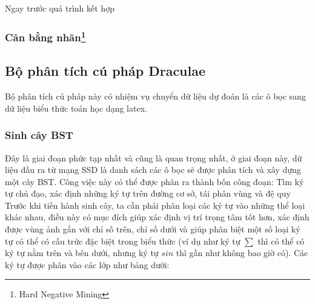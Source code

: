 \documentclass[a4paper,12pt]{article}
\begin{document}
	Ngay trước quá trình kết hợp
	
	\subsubsection*{Cân bằng nhãn\footnote{Hard Negative Mining}}	
	
	\subsection{Bộ phân tích cú pháp Draculae}
	
	Bộ phân tích cú pháp này có nhiệm vụ chuyển dữ liệu dự đoán là các ô bọc sang dữ liệu biểu thức toán học dạng latex.\\
	
	\subsubsection{Sinh cây BST}
	
	Đây là giai đoạn phức tạp nhất và cũng là quan trọng nhất, ở giai đoạn này, dữ liệu đầu ra từ mạng SSD là danh sách các ô bọc sẽ được phân tích và xây dựng một cây BST. Công việc này có thể được phân ra thành bốn công đoạn: Tìm ký tự chủ đạo, xác định những ký tự trên đường cơ sở, tái phân vùng và đệ quy\\
	
	Trước khi tiến hành sinh cây, ta cần phải phân loại các ký tự vào những thể loại khác nhau, điều này có mục đích giúp xác định vị trí trọng tâm tốt hơn, xác định được vùng ảnh gắn với chỉ số trên, chỉ số dưới và giúp phân biệt một số loại ký tự có thể có cấu trức đặc biệt trong biểu thức (ví dụ như ký tự $\sum$ thì có thể có ký tự nằm trên và bên dưới, nhưng ký tự $sin$ thì gần như không bao giờ có). Các ký tự được phân vào các lớp như bảng dưới:
	
\end{document}
